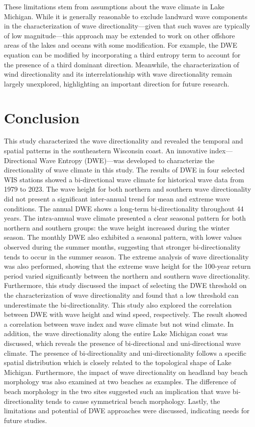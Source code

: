 These limitations stem from assumptions about the wave climate in Lake Michigan. While it is generally reasonable to exclude landward wave components in the characterization of wave directionality—given that such waves are typically of low magnitude—this approach may be extended to work on other offshore areas of the lakes and oceans with some modification. For example, the DWE equation can be modified by incorporating a third entropy term to account for the presence of a third dominant direction. Meanwhile, the characterization of wind directionality and its interrelationship with wave directionality remain largely unexplored, highlighting an important direction for future research.

\section{Conclusion}
\label{c3_Conclusion}

This study characterized the wave directionality and revealed the temporal and spatial patterns in the southeastern Wisconsin coast. An innovative index—Directional Wave Entropy (DWE)—was developed to characterize the directionality of wave climate in this study. The results of DWE in four selected WIS stations showed a bi-directional wave climate for historical wave data from 1979 to 2023. The wave height for both northern and southern wave directionality did not present a significant inter-annual trend for mean and extreme wave conditions. The annual DWE shows a long-term bi-directionality throughout 44 years. The intra-annual wave climate presented a clear seasonal pattern for both northern and southern groups: the wave height increased during the winter season. The monthly DWE also exhibited a seasonal pattern, with lower values observed during the summer months, suggesting that stronger bi-directionality tends to occur in the summer season. The extreme analysis of wave directionality was also performed, showing that the extreme wave height for the 100-year return period varied significantly between the northern and southern wave directionality. Furthermore, this study discussed the impact of selecting the DWE threshold on the characterization of wave directionality and found that a low threshold can underestimate the bi-directionality. This study also explored the correlation between DWE with wave height and wind speed, respectively. The result showed a correlation between wave index and wave climate but not wind climate. In addition, the wave directionality along the entire Lake Michigan coast was discussed, which reveals the presence of bi-directional and uni-directional wave climate. The presence of bi-directionality and uni-directionality follows a specific spatial distribution which is closely related to the topological shape of Lake Michigan. Furthermore, the impact of wave directionality on headland bay beach morphology was also examined at two beaches as examples. The difference of beach morphology in the two sites suggested such an implication that wave bi-directionality tends to cause symmetrical beach morphology. Lastly, the limitations and potential of DWE approaches were discussed, indicating needs for future studies.